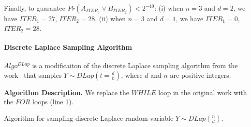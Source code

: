 Finally, to guarantee $Pr\left(A_{ITER_1}\lor B_{ITER_2} \right)<2^{-40}$:
(i) when $n=3$ and $d=2$, we have $ITER_1=27$, $ITER_2=28$,
(ii) when $n=3$ and $d=1$, we have $ITER_1=0$, $ITER_2=28$.


\paragraph{Discrete Laplace Sampling Algorithm}
\label{para:DiscrettLaplaceSamplingAlgorithm}
$Algo^{DLap}$ is a modificaiton of the discrete Laplace sampling algorithm from the work~\cite{canonne2020discrete} that samples $Y\sim DLap\left( t=\frac{d}{n}\right)$, where $d$ and $n$ are positive integers.

\textbf{Algorithm Description.}
We replace the $WHILE$ loop in the original work with the $FOR$ loops (line 1).

\begin{algorithm}[tbh!]
    \centering
    \caption{Algorithm for sampling discrete Laplace random variable $Y \sim  DLap\left(\frac{n}{d}\right)$.}
    \label{algo:DiscreteLapCKS}
\end{algorithm}
\FloatBarrier


